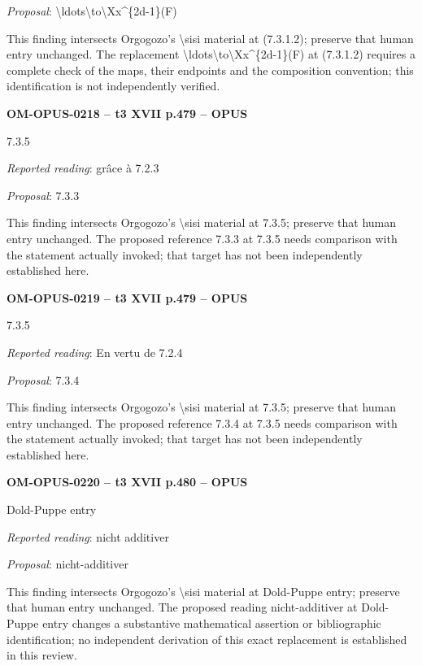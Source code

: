 \emph{Proposal}: \textbackslash{}ldots\textbackslash{}to\textbackslash{}Xx\textasciicircum{}\{2d-1\}(F)\par
This finding intersects Orgogozo's \textbackslash{}sisi material at (7.3.1.2); preserve that human entry unchanged. The replacement \textbackslash{}ldots\textbackslash{}to\textbackslash{}Xx\textasciicircum{}\{2d-1\}(F) at (7.3.1.2) requires a complete check of the maps, their endpoints and the composition convention; this identification is not independently verified.\par
\par\noindent\textbf{OM-OPUS-0218 -- t3 XVII p.479 -- OPUS}\par
7.3.5\par
\emph{Reported reading}: grâce à 7.2.3\par
\emph{Proposal}: 7.3.3\par
This finding intersects Orgogozo's \textbackslash{}sisi material at 7.3.5; preserve that human entry unchanged. The proposed reference 7.3.3 at 7.3.5 needs comparison with the statement actually invoked; that target has not been independently established here.\par
\par\noindent\textbf{OM-OPUS-0219 -- t3 XVII p.479 -- OPUS}\par
7.3.5\par
\emph{Reported reading}: En vertu de 7.2.4\par
\emph{Proposal}: 7.3.4\par
This finding intersects Orgogozo's \textbackslash{}sisi material at 7.3.5; preserve that human entry unchanged. The proposed reference 7.3.4 at 7.3.5 needs comparison with the statement actually invoked; that target has not been independently established here.\par
\par\noindent\textbf{OM-OPUS-0220 -- t3 XVII p.480 -- OPUS}\par
Dold-Puppe entry\par
\emph{Reported reading}: nicht additiver\par
\emph{Proposal}: nicht-additiver\par
This finding intersects Orgogozo's \textbackslash{}sisi material at Dold-Puppe entry; preserve that human entry unchanged. The proposed reading nicht-additiver at Dold-Puppe entry changes a substantive mathematical assertion or bibliographic identification; no independent derivation of this exact replacement is established in this review.\par
